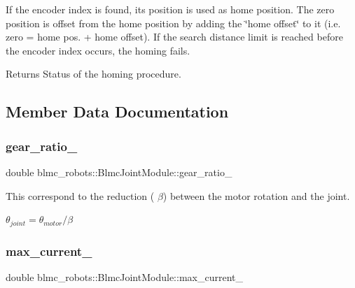 If the encoder index is found, its position is used as home position. The zero position is offset from the home position by adding the \char`\"{}home
offset\char`\"{} to it (i.\+e. zero = home pos. + home offset). If the search distance limit is reached before the encoder index occurs, the homing fails.

\begin{DoxyReturn}{Returns}
Status of the homing procedure. 
\end{DoxyReturn}


\subsection{Member Data Documentation}
\mbox{\label{classblmc__robots_1_1BlmcJointModule_af013668d69e7cea2dcc21da8c1c9e4e6}} 
\subsubsection{\texorpdfstring{gear\+\_\+ratio\+\_\+}{gear\_ratio\_}}
{\footnotesize\ttfamily double blmc\+\_\+robots\+::\+Blmc\+Joint\+Module\+::gear\+\_\+ratio\+\_\+\hspace{0.3cm}{\ttfamily [private]}}



This correspond to the reduction ( $ \beta $) between the motor rotation and the joint. 

$ \theta_{joint} = \theta_{motor} / \beta $ \mbox{\label{classblmc__robots_1_1BlmcJointModule_af10e1b734a9d4735301962fd9f9c413f}} 
\subsubsection{\texorpdfstring{max\+\_\+current\+\_\+}{max\_current\_}}
{\footnotesize\ttfamily double blmc\+\_\+robots\+::\+Blmc\+Joint\+Module\+::max\+\_\+current\+\_\+\hspace{0.3cm}{\ttfamily [private]}}




